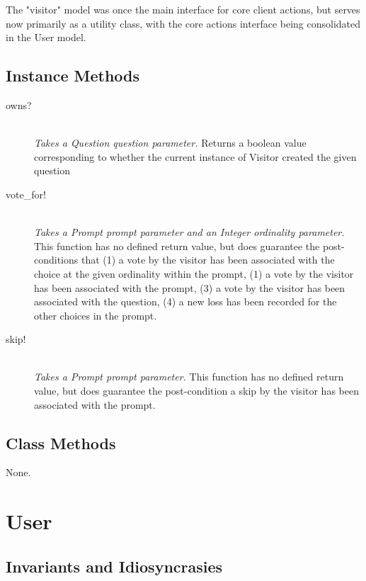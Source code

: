 \documentclass[11pt]{book}
\begin{document}
The "visitor" model was once the main interface for core client actions, but serves now primarily as a utility class, with the core actions interface being consolidated in the User model.


\subsection{Instance Methods}

\begin{description}
	\item[owns?]  \hfill \\
  \emph{Takes a Question question parameter.} Returns a boolean value corresponding to whether the current instance of Visitor created the given question


	\item[vote\_for!]  \hfill \\
  \emph{Takes a Prompt prompt parameter and an Integer ordinality parameter.} This function has no defined return value, but does guarantee the post-conditions that (1) a vote by the visitor has been associated with the choice at the given ordinality within the prompt, (1) a vote by the visitor has been associated with the prompt, (3) a vote by the visitor has been associated with the question, (4) a new loss has been recorded for the other choices in the prompt.
  
  \item[skip!]  \hfill \\
  \emph{Takes a Prompt prompt parameter.} This function has no defined return value, but does guarantee the post-condition a skip by the visitor has been associated with the prompt.
  
\end{description}

\subsection{Class Methods}

None.










\section{User}

\subsection{Invariants and Idiosyncrasies}
\end{document}
